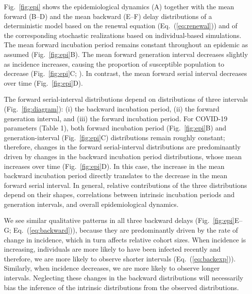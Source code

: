 \documentclass[12pt]{article}
\newcommand{\eref}[1]{Eq.~(\ref{eq:#1})}
\newcommand{\fref}[1]{Fig.~\ref{fig:#1}}
\begin{document}
\fref{epi} shows the epidemiological dynamics (A) together with the mean forward (B--D) and the mean backward (E--F) delay distributions of a deterministic model based on the renewal equation (\eref{renewal}) and of the corresponding stochastic realizations based on individual-based simulations.
The mean forward incubation period remains constant throughout an epidemic as assumed (\fref{epi}B).
The mean forward generation interval decreases slightly as incidence increases, causing the proportion of susceptible population to decrease (\fref{epi}C; \cite{kenah2008generation, champredon2015intrinsic}).
In contrast, the mean forward serial interval decreases over time (\fref{epi}D).

The forward serial-interval distributions depend on distributions of three intervals
(\fref{diagram}): (i) the backward incubation period, (ii) the forward generation interval, and (iii) the forward incubation period.
For COVID-19 parameters (Table 1), both forward incubation period (\fref{epi}B) and generation-interval (\fref{epi}C) distributions remain roughly constant;
therefore, changes in the forward serial-interval distributions are predominantly driven by changes in the backward incubation period distributions, whose mean increases over time (\fref{epi}D).
In this case, the increase in the mean backward incubation period directly translates to the decrease in the mean forward serial interval.
In general, relative contributions of the three distributions depend on their shapes, correlations between intrinsic incubation periods and generation intervals, and overall epidemiological dynamics.

We see similar qualitative patterns in all three backward delays (\fref{epi}E--G; \eref{backward}), because they are predominantly driven by the rate of change in incidence, which in turn affects relative cohort sizes.
When incidence is increasing, individuals are more likely to have been infected recently and therefore, we are more likely to observe shorter intervals (\eref{backexp}).
Similarly, when incidence decreases, we are more likely to observe longer intervals.
Neglecting these changes in the backward distributions will necessarily bias the inference of the intrinsic distributions from the observed distributions.
\end{document}
